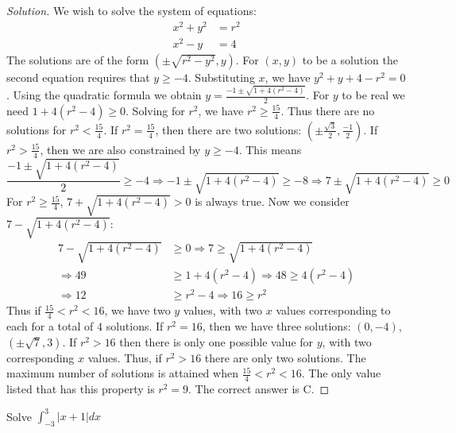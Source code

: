\documentclass[crop=false,class=book,oneside]{standalone}
\begin{document}
\begin{proof}[Solution]
We wish to solve the system of equations:
\begin{align*}
    x^{2}+y^{2}&=r^{2}\\
    x^{2}-y&=4
\end{align*}
The solutions are of the form $(\pm \sqrt{r^2-y^2},y)$. For $(x,y)$ to be a solution the second equation requires that $y\geq -4$. Substituting $x$, we have $y^2+y+4 - r^2 = 0$. Using the quadratic formula we obtain $y = \frac{-1 \pm \sqrt{1 + 4(r^2-4)}}{2}$. For $y$ to be real we need $1+4(r^2-4) \geq 0$. Solving for $r^2$, we have $r^2 \geq \frac{15}{4}$. Thus there are no solutions for $r^2< \frac{15}{4}$. If $r^2 = \frac{15}{4}$, then there are two solutions: $(\pm \frac{\sqrt{3}}{2}, \frac{-1}{2})$. If $r^2 > \frac{15}{4}$, then we are also constrained by $y\geq -4$. This means 
\begin{equation*}
    \frac{-1\pm\sqrt{1+4(r^{2}-4)}}{2}\geq -4\Rightarrow -1\pm\sqrt{1+4(r^{2}-4)}\geq -8\Rightarrow 7\pm\sqrt{1+4(r^{2}-4)}\geq 0
\end{equation*}
 For $r^2 \geq \frac{15}{4}$, $7+\sqrt{1+4(r^2-4)}>0$ is always true. Now we consider $7-\sqrt{1+4(r^2-4)}:$
\begin{align*}
    7-\sqrt{1+4(r^{2}-4)}&\geq 0\Rightarrow 7\geq\sqrt{1+4(r^{2}-4)}\\
    \Rightarrow 49&\geq 1+4(r^{2}-4)\Rightarrow 48\geq 4(r^{2}-4)\\
    \Rightarrow 12&\geq r^{2}-4\Rightarrow 16\geq r^{2}
\end{align*}
Thus if $\frac{15}{4}<r^2<16$, we have two $y$ values, with two $x$ values corresponding to each for a total of $4$ solutions. If $r^2 = 16$, then we have three solutions: $(0,-4)$, $(\pm \sqrt{7},3)$. If $r^2>16$ then there is only one possible value for $y$, with two corresponding $x$ values. Thus, if $r^2>16$ there are only two solutions. The maximum number of solutions is attained when $\frac{15}{4} < r^2 <16$. The only value listed that has this property is $r^2 = 9$. The correct answer is C.
\end{proof}
\begin{problem}
Solve $\int_{-3}^{3}|x+1|dx$
\end{problem}
\end{document}
